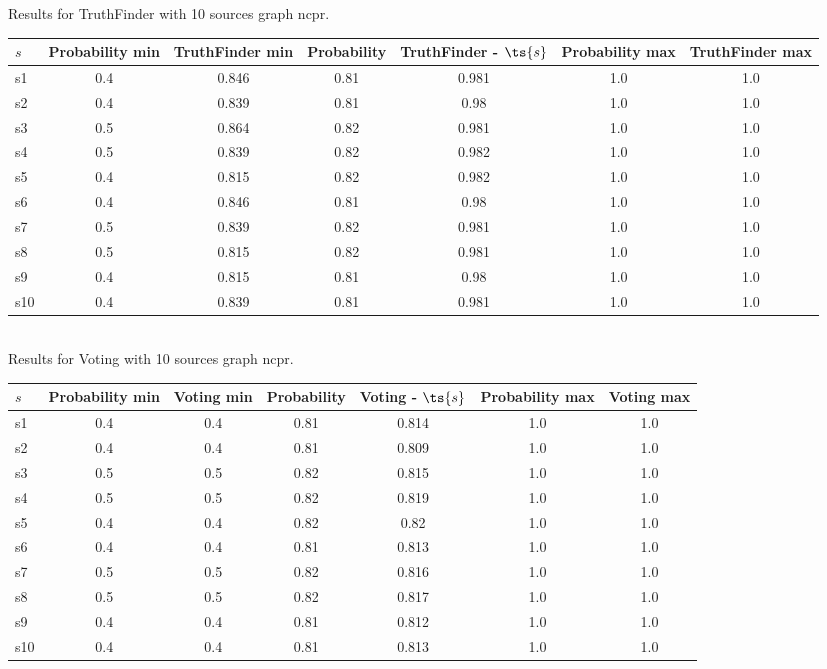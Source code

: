 \documentclass{article}
\begin{document}
\noindent Results for TruthFinder with 10 sources graph ncpr.

\noindent\begin{tabular}{|l|c|c|c|c|c|c|}
\hline
$s$& Probability min & TruthFinder min & Probability & TruthFinder - $\ts{s}$ & Probability max & TruthFinder max\\
\hline
s1 &0.4 & 0.846 & 0.81 & 0.981 & 1.0 & 1.0\\
\hline
s2 &0.4 & 0.839 & 0.81 & 0.98 & 1.0 & 1.0\\
\hline
s3 &0.5 & 0.864 & 0.82 & 0.981 & 1.0 & 1.0\\
\hline
s4 &0.5 & 0.839 & 0.82 & 0.982 & 1.0 & 1.0\\
\hline
s5 &0.4 & 0.815 & 0.82 & 0.982 & 1.0 & 1.0\\
\hline
s6 &0.4 & 0.846 & 0.81 & 0.98 & 1.0 & 1.0\\
\hline
s7 &0.5 & 0.839 & 0.82 & 0.981 & 1.0 & 1.0\\
\hline
s8 &0.5 & 0.815 & 0.82 & 0.981 & 1.0 & 1.0\\
\hline
s9 &0.4 & 0.815 & 0.81 & 0.98 & 1.0 & 1.0\\
\hline
s10 &0.4 & 0.839 & 0.81 & 0.981 & 1.0 & 1.0\\
\hline
\end{tabular}\\

\noindent Results for Voting with 10 sources graph ncpr.

\noindent\begin{tabular}{|l|c|c|c|c|c|c|}
\hline
$s$& Probability min & Voting min & Probability & Voting - $\ts{s}$ & Probability max & Voting max\\
\hline
s1 &0.4 & 0.4 & 0.81 & 0.814 & 1.0 & 1.0\\
\hline
s2 &0.4 & 0.4 & 0.81 & 0.809 & 1.0 & 1.0\\
\hline
s3 &0.5 & 0.5 & 0.82 & 0.815 & 1.0 & 1.0\\
\hline
s4 &0.5 & 0.5 & 0.82 & 0.819 & 1.0 & 1.0\\
\hline
s5 &0.4 & 0.4 & 0.82 & 0.82 & 1.0 & 1.0\\
\hline
s6 &0.4 & 0.4 & 0.81 & 0.813 & 1.0 & 1.0\\
\hline
s7 &0.5 & 0.5 & 0.82 & 0.816 & 1.0 & 1.0\\
\hline
s8 &0.5 & 0.5 & 0.82 & 0.817 & 1.0 & 1.0\\
\hline
s9 &0.4 & 0.4 & 0.81 & 0.812 & 1.0 & 1.0\\
\hline
s10 &0.4 & 0.4 & 0.81 & 0.813 & 1.0 & 1.0\\
\hline
\end{tabular}\\
\end{document}
